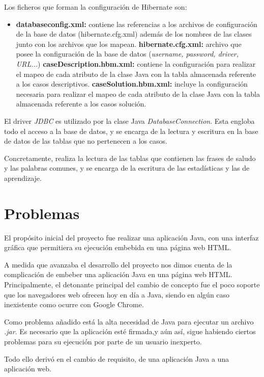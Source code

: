 Los ficheros que forman la configuración de Hibernate son:

\begin{itemize}
\tightlist
\item
\textbf{databaseconfig.xml:} contiene las referencias a los archivos de configuración de la base de datos (hibernate.cfg.xml) además de los nombres de las clases junto con los archivos que los mapean.
\textbf{hibernate.cfg.xml:} archivo que posee la configuración de la base de datos (\emph{username, password, driver, URL...})
\textbf{caseDescription.hbm.xml:} contiene la configuración para realizar el mapeo de cada atributo de la clase Java con la tabla almacenada referente a los casos descriptivos.
\textbf{caseSolution.hbm.xml:} incluye la configuración necesaria para realizar el mapeo de cada atributo de la clase Java con la tabla almacenada referente a los casos solución.
\end{itemize}

El driver \emph{JDBC} es utilizado por la clase Java \emph{DatabaseConnection}. Esta engloba todo el acceso a la base de datos, y se encarga de la lectura y escritura en la base de datos de las tablas que no pertenecen a los casos.

Concretamente, realiza la lectura de las tablas que contienen las frases de saludo y las palabras comunes, y se encarga de la escritura de las estadísticas y las de aprendizaje.


\section{Problemas}\label{problemas}

El propósito inicial del proyecto fue realizar una aplicación Java, con una interfaz gráfica que permitiera su ejecución embebida en una página web HTML.

A medida que avanzaba el desarrollo del proyecto nos dimos cuenta de la complicación de embeber una aplicación Java en una página web HTML. Principalmente, el detonante principal del cambio de concepto fue el poco soporte que los navegadores web ofrecen hoy en día a Java, siendo en algún caso inexistente como ocurre con Google Chrome.

Como problema añadido está la alta necesidad de Java para ejecutar un archivo \emph{.jar}. Es necesario que la aplicación esté firmada,y aún así, sigue habiendo ciertos problemas para su ejecución por parte de un usuario inexperto.

Todo ello derivó en el cambio de requisito, de una aplicación Java a una aplicación web.

